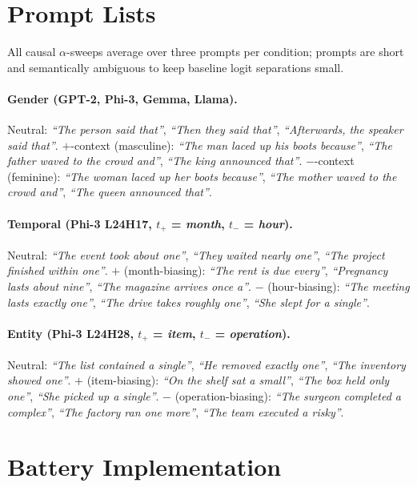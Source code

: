 \section{Prompt Lists}
\label{app:prompts}

All causal $\alpha$-sweeps average over three prompts per condition;
prompts are short and semantically ambiguous to keep baseline logit
separations small.

\paragraph{Gender (GPT-2, Phi-3, Gemma, Llama).}
Neutral: \emph{``The person said that''}, \emph{``Then they said that''},
\emph{``Afterwards, the speaker said that''}.
$+$-context (masculine): \emph{``The man laced up his boots because''},
\emph{``The father waved to the crowd and''}, \emph{``The king announced that''}.
$-$-context (feminine): \emph{``The woman laced up her boots because''},
\emph{``The mother waved to the crowd and''}, \emph{``The queen announced that''}.

\paragraph{Temporal (Phi-3 L24H17, $t_+$ = \emph{month}, $t_-$ = \emph{hour}).}
Neutral: \emph{``The event took about one''}, \emph{``They waited
nearly one''}, \emph{``The project finished within one''}.
$+$ (month-biasing): \emph{``The rent is due every''}, \emph{``Pregnancy
lasts about nine''}, \emph{``The magazine arrives once a''}.
$-$ (hour-biasing): \emph{``The meeting lasts exactly one''}, \emph{``The
drive takes roughly one''}, \emph{``She slept for a single''}.

\paragraph{Entity (Phi-3 L24H28, $t_+$ = \emph{item}, $t_-$ = \emph{operation}).}
Neutral: \emph{``The list contained a single''}, \emph{``He removed
exactly one''}, \emph{``The inventory showed one''}.
$+$ (item-biasing): \emph{``On the shelf sat a small''}, \emph{``The
box held only one''}, \emph{``She picked up a single''}.
$-$ (operation-biasing): \emph{``The surgeon completed a complex''},
\emph{``The factory ran one more''}, \emph{``The team executed a risky''}.

\section{Battery Implementation}
\label{app:battery_details}

